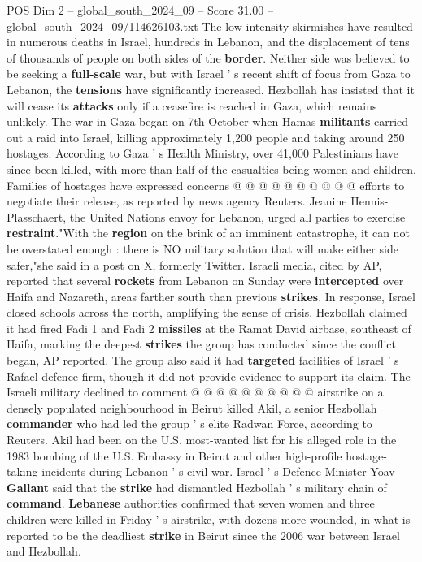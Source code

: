 \begin{textsample}{POS Dim 2 – global\_south\_2024\_09 – Score 31.00 – global\_south\_2024\_09/114626103.txt}
The low-intensity skirmishes have resulted in numerous deaths in Israel, hundreds in Lebanon, and the displacement of tens of thousands of people on both sides of the \textbf{border}.
Neither side was believed to be seeking a \textbf{full-scale} war, but with Israel ' s recent shift of focus from Gaza to Lebanon, the \textbf{tensions} have significantly increased.
Hezbollah has insisted that it will cease its \textbf{attacks} only if a ceasefire is reached in Gaza, which remains unlikely.
The war in Gaza began on 7th October when Hamas \textbf{militants} carried out a raid into Israel, killing approximately 1,200 people and taking around 250 hostages.
According to Gaza ' s Health Ministry, over 41,000 Palestinians have since been killed, with more than half of the casualties being women and children.
Families of hostages have expressed concerns @ @ @ @ @ @ @ @ @ @ efforts to negotiate their release, as reported by news agency Reuters.
Jeanine Hennis-Plasschaert, the United Nations envoy for Lebanon, urged all parties to exercise \textbf{restraint}."With the \textbf{region} on the brink of an imminent catastrophe, it can not be overstated enough : there is NO military solution that will make either side safer,"she said in a post on X, formerly Twitter.
Israeli media, cited by AP, reported that several \textbf{rockets} from Lebanon on Sunday were \textbf{intercepted} over Haifa and Nazareth, areas farther south than previous \textbf{strikes}.
In response, Israel closed schools across the north, amplifying the sense of crisis.
Hezbollah claimed it had fired Fadi 1 and Fadi 2 \textbf{missiles} at the Ramat David airbase, southeast of Haifa, marking the deepest \textbf{strikes} the group has conducted since the conflict began, AP reported.
The group also said it had \textbf{targeted} facilities of Israel ' s Rafael defence firm, though it did not provide evidence to support its claim.
The Israeli military declined to comment @ @ @ @ @ @ @ @ @ @ airstrike on a densely populated neighbourhood in Beirut killed Akil, a senior Hezbollah \textbf{commander} who had led the group ' s elite Radwan Force, according to Reuters.
Akil had been on the U.S. most-wanted list for his alleged role in the 1983 bombing of the U.S.
Embassy in Beirut and other high-profile hostage-taking incidents during Lebanon ' s civil war.
Israel ' s Defence Minister Yoav \textbf{Gallant} said that the \textbf{strike} had dismantled Hezbollah ' s military chain of \textbf{command}. \textbf{Lebanese} authorities confirmed that seven women and three children were killed in Friday ' s airstrike, with dozens more wounded, in what is reported to be the deadliest \textbf{strike} in Beirut since the 2006 war between Israel and Hezbollah.

\end{textsample}
